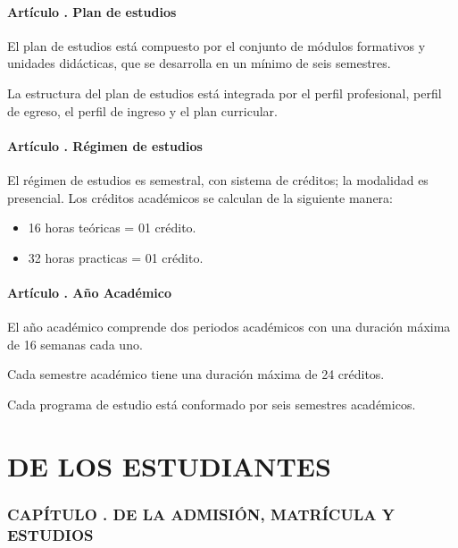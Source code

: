 \subsection{Artículo . Plan de estudios}
\addtocounter{ns}{1}
El plan de estudios está compuesto por el conjunto de módulos formativos y unidades didácticas, que se desarrolla en un mínimo de seis semestres. 

La estructura del plan de estudios está integrada por el perfil profesional, perfil de egreso, el perfil de ingreso y el plan curricular.
\subsection{Artículo . Régimen de estudios}
\addtocounter{ns}{1}
El régimen de estudios es semestral, con sistema de créditos; la modalidad es presencial. Los créditos académicos se calculan de la siguiente manera:
\begin{itemize}
\item 16 horas teóricas = 01 crédito. 
\item 32 horas practicas = 01 crédito. 
\end{itemize}
\subsection{Artículo . Año Académico}
\addtocounter{ns}{1}
El año académico comprende dos periodos académicos con una duración máxima de 16 semanas cada uno. 

Cada semestre académico tiene una duración máxima de 24 créditos. 

Cada programa de estudio está conformado por seis semestres académicos.
\part{DE LOS ESTUDIANTES}
\section{CAPÍTULO . DE LA ADMISIÓN, MATRÍCULA Y ESTUDIOS}
\addtocounter{re}{1}

